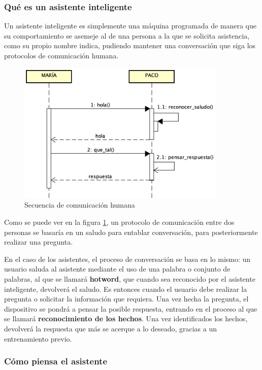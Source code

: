 \subsubsection{Qué es un asistente inteligente}

Un asistente inteligente es simplemente una máquina programada de manera que su comportamiento se asemeje al de una persona a la que se solicita asistencia, como su propio nombre indica, pudiendo mantener una conversación que siga los protocolos de comunicación humana.

\begin{figure}[h!]
    \centering
    \includegraphics[width=10cm]{./img/sequence/human.png}
    \caption{Secuencia de comunicación humana}
    \label{fig:humanseq}
\end{figure}

Como se puede ver en la figura \ref{fig:humanseq}, un protocolo de comunicación entre dos personas se basaría en un saludo para entablar conversación, para posteriormente realizar una pregunta.

En el caso de los asistentes, el proceso de conversación se basa en lo mismo: un usuario saluda al asistente mediante el uso de una palabra o conjunto de palabras, al que se llamará \textbf{hotword}, que cuando sea reconocido por el asistente inteligente, devolverá el saludo.
Es entonces cuando el usuario debe realizar la pregunta o solicitar la información que requiera.
Una vez hecha la pregunta, el dispositivo se pondrá a pensar la posible respuesta, entrando en el proceso al que se llamará \textbf{reconocimiento de los hechos}. Una vez identificados los hechos, devolverá la respuesta que más se acerque a lo deseado, gracias a un entrenamiento previo.

\subsubsection{Cómo piensa el asistente}

